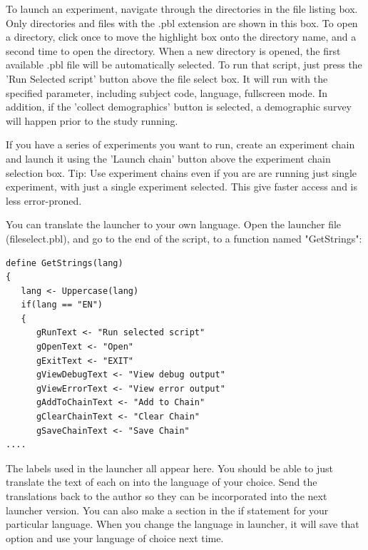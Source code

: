 
To launch an experiment, navigate through the directories in the file listing box.  Only directories and files with the .pbl extension are shown in this box.  To open a directory, click once to move the highlight box onto the directory name, and a second time to open the directory.  When a new directory is opened, the first available .pbl file will be automatically selected.  To run that script, just press the 'Run Selected script' button above the file select box.  It will run with the specified parameter, including subject code, language, fullscreen mode.  In addition, if the 'collect demographics' button is selected, a demographic survey will happen prior to the study running.

If you have a series of experiments you want to run, create an experiment chain and launch it using the 'Launch chain' button above the experiment chain selection box.  Tip: Use experiment chains even if you are are running just single experiment, with just a single experiment selected.  This give faster access and is less error-proned.

You can translate the launcher to your own language.  Open the launcher file (fileselect.pbl), and go to the end of the script, to a function named "GetStrings":
\begin{verbatim}
define GetStrings(lang)
{
   lang <- Uppercase(lang)
   if(lang == "EN")
   {
      gRunText <- "Run selected script"
      gOpenText <- "Open"
      gExitText <- "EXIT"
      gViewDebugText <- "View debug output"
      gViewErrorText <- "View error output"
      gAddToChainText <- "Add to Chain"
      gClearChainText <- "Clear Chain"
      gSaveChainText <- "Save Chain"
....
\end{verbatim}

The labels used in the launcher all appear here.  You should be able to just translate the text of each on into the language of your choice.  Send the translations back to the author so they can be incorporated into the next launcher version.  You can also make a section in the if statement for your particular language.  When you change the language in launcher, it will save that option and use your language of choice next time.

